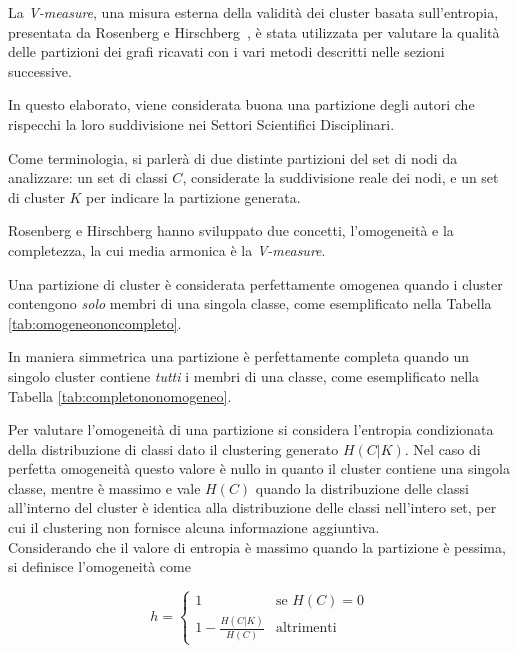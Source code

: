 \documentclass[12pt,a4paper,twoside]{report}
\begin{document}
La \textit{V-measure}, una misura esterna della validità
dei cluster basata sull'entropia, presentata da Rosenberg e Hirschberg~\cite{vmeasure}, è stata
utilizzata per valutare la qualità delle partizioni dei grafi ricavati con i vari metodi descritti
nelle sezioni successive.

In questo elaborato, viene considerata buona una partizione degli autori che rispecchi la loro
suddivisione nei Settori Scientifici Disciplinari.


Come terminologia, si parlerà di due distinte partizioni del set di nodi da analizzare: un set di
classi $C$, considerate la suddivisione reale dei nodi, e un set di cluster $K$ per indicare la
partizione generata.

Rosenberg e Hirschberg hanno sviluppato due concetti, l'omogeneità e la completezza, la cui media
armonica è la \textit{V-measure}.

Una partizione di cluster è considerata perfettamente omogenea quando i cluster contengono
\textit{solo} membri di una singola classe, come esemplificato nella Tabella
\ref{tab:omogeneononcompleto}.

In maniera simmetrica una partizione è perfettamente completa quando un singolo cluster contiene
\textit{tutti} i membri di una classe, come esemplificato nella Tabella
\ref{tab:completononomogeneo}.

Per valutare l'omogeneità di una partizione si considera l'entropia condizionata della distribuzione
di classi dato il clustering generato $H(C|K)$. Nel caso di perfetta omogeneità questo valore è
nullo in quanto il cluster contiene una singola classe, mentre è massimo e vale $H(C)$ quando la
distribuzione delle classi all'interno del cluster è identica alla distribuzione delle classi
nell'intero set, per cui il clustering non fornisce alcuna informazione aggiuntiva.
\\
Considerando che
il valore di entropia è massimo quando la partizione è pessima, si definisce l'omogeneità come

\begin{equation} \label{eq:h}
    h = \begin{cases} 1 & \mbox{se } H(C) = 0 \\ 1-\frac{H(C|K)}{H(C)} & \mbox{altrimenti} \end{cases}
\end{equation}
\end{document}
